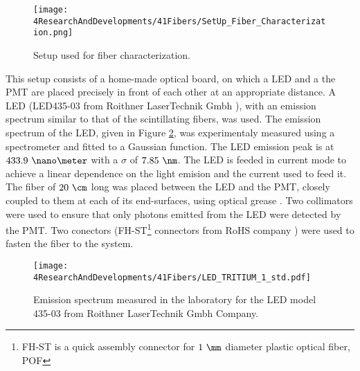 \begin{figure}[h]
\centering
\texttt{[image: 4ResearchAndDevelopments/41Fibers/SetUp\_Fiber\_Characterization.png]}
\caption{Setup used for fiber characterization.\label{fig:SetUpFiberCharacterization}}
\end{figure}

This setup consists of a home-made optical board, on which a LED and a the PMT are placed precisely in front of each other at an appropriate distance. A LED (LED435-03 from Roithner LaserTechnik Gmbh \cite{LEDRLT}), with an emission spectrum similar to that of the scintillating fibers, was used. The emission spectrum of the LED, given in Figure \ref{fig:LEDSpectrumTritium}, was experimentaly measured using a spectrometer and fitted to a Gaussian function. The LED emission peak is at $433.9~\nano\meter$ with a $\sigma$ of $7.85~\nm$. The LED is feeded in current mode to achieve a linear dependence on the light emision and the current used to feed it. The fiber of $20~\cm$ long was placed between the LED and the PMT, closely coupled to them at each of its end-surfaces, using optical grease \cite{OpticalGrease}. Two collimators were used to ensure that only photons emitted from the LED were detected by the PMT. Two conectors (FH-ST\footnote{FH-ST is a quick assembly connector for $1~\mm$ diameter plastic optical fiber, POF} connectors from RoHS company \cite{}) were used to fasten the fiber to the system. 

\begin{figure}[h]
\centering
\texttt{[image: 4ResearchAndDevelopments/41Fibers/LED\_TRITIUM\_1\_std.pdf]}
\caption{Emission spectrum measured in the laboratory for the LED model 435-03 from Roithner LaserTechnik Gmbh Company.\label{fig:LEDSpectrumTritium}}
\end{figure}